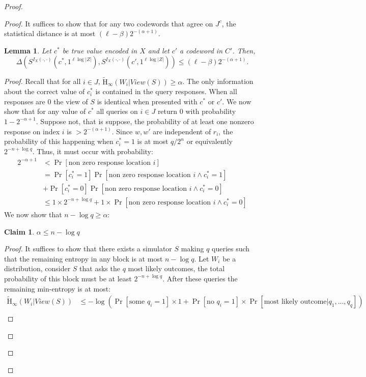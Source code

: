 \documentclass[11pt]{article}
\newcommand{\Hav}{\tilde{\mathrm{H}}_\infty}
\newtheorem{lemma}[theorem]{Lemma}
\newtheorem{claim}[theorem]{Claim}
\begin{document}
\begin{proof}
\begin{proof}
\noindent It suffices to show that for any two codewords that agree on $J^c$, the statistical distance is at most $(\ell-\beta)2^{-(\alpha+1)}$.
\begin{lemma}
\label{lem:codewords in I close}
Let $c^*$ be true value encoded in $X$ and let $c'$ a codeword in $C'$.  Then,
\[
\Delta( S^{I_X(\cdot, \cdot)}(c^*, 1^{\ell \log |Z|}), S^{I_X(\cdot, \cdot)}(c', 1^{\ell \log |Z|})) \le ( \ell -\beta) 2^{-(\alpha+1)}.
\]
\end{lemma}
\begin{proof}
Recall that for all $i\in J$, $\Hav(W_i | View(S))\geq \alpha$.  The only information about the correct value of $c_i^*$ is contained in the query responses.  When all responses are $0$ the view of $S$ is identical when presented with $c^*$ or $c'$.  We now show that for any value of $c^*$ all queries on $i \in J$ return $0$ with probability $1-2^{-\alpha+1}$.  Suppose not, that is suppose, the probability of at least one nonzero response on index $i$ is $> 2^{-(\alpha+1)}$.  Since $w, w'$ are independent of $r_i$, the probability of this happening when $c^*_i = 1$ is at most $q/2^n$ or equivalently $2^{-n+\log q}$.  Thus, it must occur with probability:
\begin{align}
2^{-\alpha+1}&<\Pr[\text{non zero response location }i]\nonumber \\
 &= \Pr[c_i^* =1]\Pr[\text{non zero response location }i\wedge c_i^*=1]\nonumber \\&+ \Pr[c_i^*=0] \Pr[\text{non zero response location }i \wedge c_i^*=0]\nonumber \\
&\le 1\times 2^{-n+\log q} + 1\times  \Pr[\text{non zero response location }i \wedge c_i^*=0] \label{eq:ways to remove ent}
\end{align}
We now show that $n-\log q \geq \alpha$:
\begin{claim}
\label{cl:ent bounded away from n}
$\alpha \le n-\log q$
\end{claim}
\begin{proof}
It suffices to show that there exists a simulator $S$ making $q$ queries such that the remaining entropy in any block is at most $n-\log q$.  Let $W_i$ be a distribution, consider $S$ that asks the $q$ most likely outcomes, the total probability of this block must be at least $2^{-n+\log q}$.  After these queries the remaining min-entropy is at most:
\begin{align*}
\Hav(W_i | View(S)) &\leq  -\log \left(\Pr[\text{some }q_i=1]\times 1+ \Pr[\text{no }q_i=1]\times \Pr[\text{most likely outcome}|q_1,...,q_q]\right)\\

\end{align*}
\end{proof}
\end{proof}
\end{proof}
\end{proof}
\end{document}
